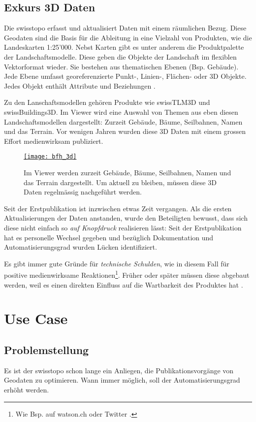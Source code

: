 \newpage

\subsection{Exkurs 3D Daten}
Die swisstopo erfasst und aktualisiert Daten mit einem räumlichen Bezug. Diese Geodaten sind die Basis für die Ableitung in eine Vielzahl von Produkten, wie die Landeskarten 1:25'000. Nebst Karten gibt es unter anderem die Produktpalette der Landschaftsmodelle. Diese geben die Objekte der Landschaft im flexiblen Vektorformat wieder. Sie bestehen aus thematischen Ebenen (Bsp. Gebäude). Jede Ebene umfasst georeferenzierte Punkt-, Linien-, Flächen- oder 3D Objekte. Jedes Objekt enthält Attribute und Beziehungen \cite{toposhop2010}.

Zu den Lanschaftsmodellen gehören Produkte wie swissTLM3D und swissBuildings3D. Im Viewer wird eine Auswahl von Themen aus eben diesen Landschaftsmodellen dargestellt: Zurzeit Gebäude, Bäume, Seilbahnen, Namen und das Terrain. Vor wenigen Jahren wurden diese 3D Daten mit einem grossen Effort medienwirksam publiziert.

\begin{figure}[H]
	\centering
	\href{https://s.geo.admin.ch/8a8ce63073}{
	\texttt{[image: bfh\_3d]}}
	\caption{Im Viewer werden zurzeit Gebäude, Bäume, Seilbahnen, Namen und das Terrain dargestellt. Um aktuell zu bleiben, müssen diese 3D Daten regelmässig nachgeführt werden.}
	\label{fig:bfh_3d}
\end{figure}

Seit der Erstpublikation ist inzwischen etwas Zeit vergangen. Als die ersten Aktualisierungen der Daten anstanden, wurde den Beteiligten bewusst, dass sich diese nicht einfach so \emph{auf Knopfdruck} realisieren lässt: Seit der Erstpublikation hat es personelle Wechsel gegeben und bezüglich Dokumentation und Automatisierungsgrad wurden Lücken identifiziert.

Es gibt immer gute Gründe für \emph{technische Schulden}, wie in diesem Fall für positive medienwirksame Reaktionen\footnote{Wie Bsp. auf watson.ch oder Twitter \cite{watson2018}.}. Früher oder später müssen diese abgebaut werden, weil es einen direkten Einfluss auf die Wartbarkeit des Produktes hat \cite{technischeschulden2010}.

\section{Use Case}
\subsection{Problemstellung}
Es ist der swisstopo schon lange ein Anliegen, die Publikationsvorgänge von Geodaten zu optimieren. Wann immer möglich, soll der Automatisierungsgrad erhöht werden.

